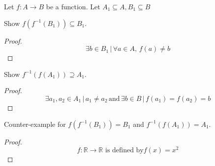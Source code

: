 \documentclass[12pt]{article}
\theoremstyle{definition}
\newenvironment{problem}[2][Problem]{\begin{trivlist}
    \item[\hskip \labelsep {\bfseries #1}\hskip \labelsep {\bfseries #2.}]}{\end{trivlist}}
\begin{document}
Let $f:A \rightarrow B$ be a function.
Let $A_1 \subseteq A, B_1 \subseteq B$
\begin{problem}{1}
    Show $f(f^{-1}(B_1)) \subseteq B_1$.
\end{problem}
\begin{proof}
    \[ \exists b \in B_1 \, | \, \forall a \in A, \, f(a) \neq b \]
\end{proof}

\begin{problem}{2}
    Show $f^{-1}(f(A_1)) \supseteq A_1$.
\end{problem}
\begin{proof}
    \[ \exists a_1, a_2 \in A_1 \, | \, a_1 \neq a_2 \, \text{and} \, \exists b \in B \, | \, f(a_1) = f(a_2) = b \]
\end{proof}

\begin{problem}{3}
    Counter-example for $f(f^{-1}(B_1)) = B_1$ and $f^{-1}(f(A_1)) = A_1$.
\end{problem}
\begin{proof}
    \[ f: \mathbb{R} \to \mathbb{R} \text{ is defined by} f(x) = x^2 \]
\end{proof}

\end{document}
